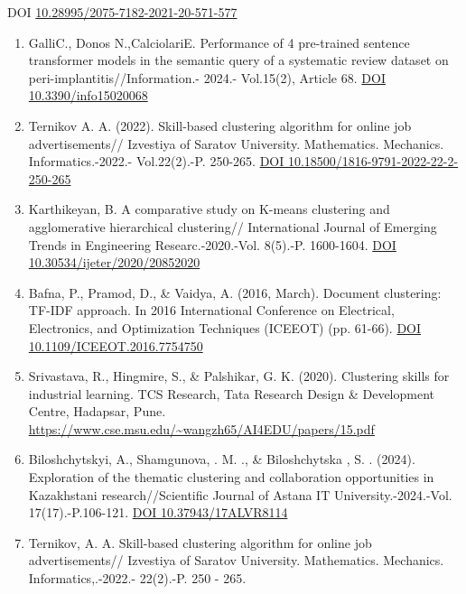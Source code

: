 DOI
\href{http://dx.doi.org/10.28995/2075-7182-2021-20-571-577}{10.28995/2075-7182-2021-20-571-577}

\begin{enumerate}
\def\labelenumi{\arabic{enumi}.}
\setcounter{enumi}{7}
\item
  GalliC., Donos N.,CalciolariE. Performance of 4 pre-trained sentence
  transformer models in the semantic query of a systematic review
  dataset on peri-implantitis//Information.- 2024.- Vol.15(2), Article
  68. \href{https://doi.org/10.3390/info15020068}{DOI
  10.3390/info15020068}
\item
  Ternikov A. A. (2022). Skill-based clustering algorithm for online job
  advertisements// Izvestiya of Saratov University. Mathematics.
  Mechanics. Informatics.-2022.- Vol.22(2).-P. 250-265.
  \href{https://doi.org/10.18500/1816-9791-2022-22-2-250-265}{DOI
  10.18500/1816-9791-2022-22-2-250-265}
\item
  Karthikeyan, B. A comparative study on K-means clustering and
  agglomerative hierarchical clustering// International Journal of
  Emerging Trends in Engineering Researc.-2020.-Vol. 8(5).-P. 1600-1604.
  \href{https://doi.org/10.30534/ijeter/2020/20852020}{DOI
  10.30534/ijeter/2020/20852020}
\item
  Bafna, P., Pramod, D., \& Vaidya, A. (2016, March). Document
  clustering: TF-IDF approach. In 2016 International Conference on
  Electrical, Electronics, and Optimization Techniques (ICEEOT) (pp.
  61-66). \href{https://doi.org/10.1109/ICEEOT.2016.7754750}{DOI
  10.1109/ICEEOT.2016.7754750}
\item
  Srivastava, R., Hingmire, S., \& Palshikar, G. K. (2020). Clustering
  skills for industrial learning. TCS Research, Tata Research Design \&
  Development Centre, Hadapsar, Pune.
  \url{https://www.cse.msu.edu/~wangzh65/AI4EDU/papers/15.pdf}
\item
  Biloshchytskyi, A., Shamgunova, . M. ., \& Biloshchytska , S. .
  (2024). Exploration of the thematic clustering and collaboration
  opportunities in Kazakhstani research//Scientific Journal of Astana IT
  University.-2024.-Vol. 17(17).-P.106-121.
  \href{https://doi.org/10.37943/17ALVR8114}{DOI 10.37943/17ALVR8114}
\item
  Ternikov, A. A. Skill-based clustering algorithm for online job
  advertisements// Izvestiya of Saratov University. Mathematics.
  Mechanics. Informatics,.-2022.- 22(2).-P. 250 - 265.
\end{enumerate}

